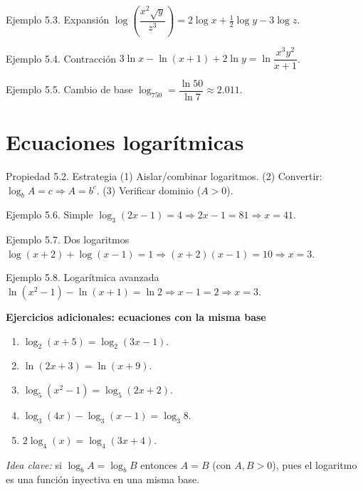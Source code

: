 \documentclass[12pt,letterpaper]{book}
\begin{document}
\begin{ejbox}{Ejemplo 5.3. Expansión}
$\log\left(\dfrac{x^2\sqrt y}{z^3}\right)=2\log x+\tfrac12\log y-3\log z$.
\end{ejbox}

\begin{ejbox}{Ejemplo 5.4. Contracción}
$3\ln x-\ln(x+1)+2\ln y=\ln\dfrac{x^3y^2}{x+1}$.
\end{ejbox}

\begin{ejbox}{Ejemplo 5.5. Cambio de base}
$\log_750=\dfrac{\ln50}{\ln7}\approx2.011$.
\end{ejbox}

\section{Ecuaciones logarítmicas}

\begin{propbox}{Propiedad 5.2. Estrategia}
(1) Aislar/combinar logaritmos. (2) Convertir: $\log_bA=c\Rightarrow A=b^c$. (3) Verificar dominio ($A>0$).
\end{propbox}

\begin{ejbox}{Ejemplo 5.6. Simple}
$\log_3(2x-1)=4\Rightarrow2x-1=81\Rightarrow x=41$.
\end{ejbox}

\begin{ejbox}{Ejemplo 5.7. Dos logaritmos}
$\log(x+2)+\log(x-1)=1\Rightarrow(x+2)(x-1)=10\Rightarrow x=3$.
\end{ejbox}

\begin{ejbox}{Ejemplo 5.8. Logarítmica avanzada}
$\ln(x^2-1)-\ln(x+1)=\ln2\Rightarrow x-1=2\Rightarrow x=3$.
\end{ejbox}

\textbf{Ejercicios adicionales: ecuaciones con la misma base}
\begin{enumerate}
\item $\log_2(x+5)=\log_2(3x-1)$.
\item $\ln(2x+3)=\ln(x+9)$.
\item $\log_5(x^2-1)=\log_5(2x+2)$.
\item $\log_3(4x)-\log_3(x-1)=\log_3 8$.
\item $2\log_4(x)=\log_4(3x+4)$.
\end{enumerate}
\textit{Idea clave:} si $\log_bA=\log_bB$ entonces $A=B$ (con $A,B>0$), pues el logaritmo es una función inyectiva en una misma base.
\end{document}
